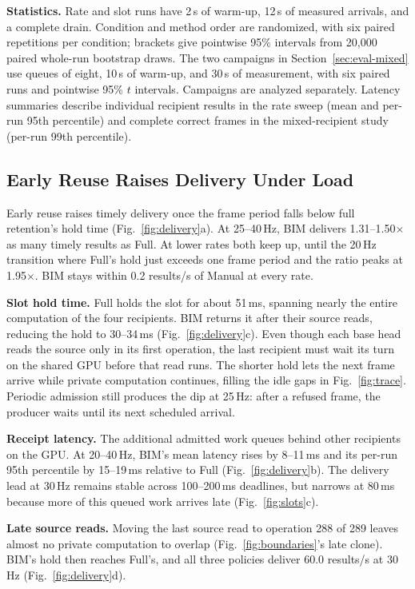 \documentclass[conference]{IEEEtran}
\newcommand{\ms}{\,ms}
\newcommand{\Hz}{\,Hz}
\begin{document}
\textbf{Statistics.} Rate and slot runs have 2\,s of warm-up, 12\,s of measured arrivals, and a complete drain. Condition and method order are randomized, with six paired repetitions per condition; brackets give pointwise 95\% intervals from 20,000 paired whole-run bootstrap draws. The two campaigns in Section~\ref{sec:eval-mixed} use queues of eight, 10\,s of warm-up, and 30\,s of measurement, with six paired runs and pointwise 95\% $t$ intervals. Campaigns are analyzed separately. Latency summaries describe individual recipient results in the rate sweep (mean and per-run 95th percentile) and complete correct frames in the mixed-recipient study (per-run 99th percentile).

\subsection{Early Reuse Raises Delivery Under Load}
\label{sec:eval-delivery}

Early reuse raises timely delivery once the frame period falls below full retention's hold time (Fig.~\ref{fig:delivery}a). At 25--40\Hz, BIM delivers 1.31--1.50$\times$ as many timely results as Full. At lower rates both keep up, until the 20\Hz{} transition where Full's hold just exceeds one frame period and the ratio peaks at 1.95$\times$. BIM stays within 0.2 results/s of Manual at every rate.

\textbf{Slot hold time.} Full holds the slot for about 51\ms, spanning nearly the entire computation of the four recipients. BIM returns it after their source reads, reducing the hold to 30--34\ms{} (Fig.~\ref{fig:delivery}c). Even though each base head reads the source only in its first operation, the last recipient must wait its turn on the shared GPU before that read runs. The shorter hold lets the next frame arrive while private computation continues, filling the idle gaps in Fig.~\ref{fig:trace}. Periodic admission still produces the dip at 25\Hz: after a refused frame, the producer waits until its next scheduled arrival.

\textbf{Receipt latency.} The additional admitted work queues behind other recipients on the GPU. At 20--40\Hz, BIM's mean latency rises by 8--11\ms{} and its per-run 95th percentile by 15--19\ms{} relative to Full (Fig.~\ref{fig:delivery}b). The delivery lead at 30\Hz{} remains stable across 100--200\ms{} deadlines, but narrows at 80\ms{} because more of this queued work arrives late (Fig.~\ref{fig:slots}c).

\textbf{Late source reads.}\label{sec:eval-late} Moving the last source read to operation 288 of 289 leaves almost no private computation to overlap (Fig.~\ref{fig:boundaries}'s late clone). BIM's hold then reaches Full's, and all three policies deliver 60.0 results/s at 30\Hz{} (Fig.~\ref{fig:delivery}d).
\end{document}
